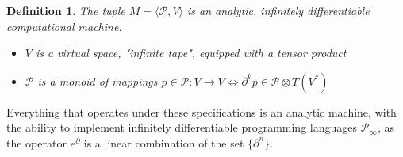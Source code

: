 \documentclass{article}
\newcommand{\dP}{\mathcal{P}}
\newcommand{\D}{\partial}
\newtheorem{definicija}{Definition}[section]
\begin{document}
\begin{definicija}
   The tuple $M=\langle\dP, V\rangle$ is an analytic, infinitely  differentiable computational machine.
   
    \begin{itemize}
    \item
    $V$ is a virtual space, "infinite tape", equipped with a tensor product
    \item
    $\dP$ is a monoid of mappings $p\in\dP:V\to V\iff\D^k p\in \dP\otimes T(V^*)$
    \end{itemize}
  \end{definicija}
  Everything that operates under these specifications is an analytic machine, with the ability to implement infinitely differentiable programming languages $\dP_\infty$, as the operator $e^\D$ is a linear combination of the set $\{\D^n\}$.
\end{document}
